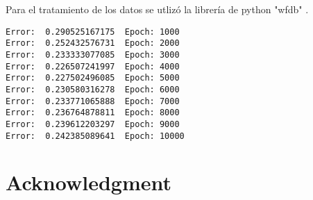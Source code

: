 \documentclass[conference]{IEEEtran}
\theoremstyle{definition}
\begin{document}
Para el tratamiento de los datos se utlizó la librería de python "wfdb" \cite{WFDB}.

\begin{lstlisting}[frame=single]
Error: 	0.290525167175 	Epoch: 1000
Error: 	0.252432576731 	Epoch: 2000
Error: 	0.233333077085 	Epoch: 3000
Error: 	0.226507241997 	Epoch: 4000
Error: 	0.227502496085 	Epoch: 5000
Error: 	0.230580316278 	Epoch: 6000
Error: 	0.233771065888 	Epoch: 7000
Error: 	0.236764878811 	Epoch: 8000
Error: 	0.239612203297 	Epoch: 9000
Error: 	0.242385089641 	Epoch: 10000
\end{lstlisting}

\IEEEpeerreviewmaketitle

\section*{Acknowledgment}

\newpage



\end{document}
